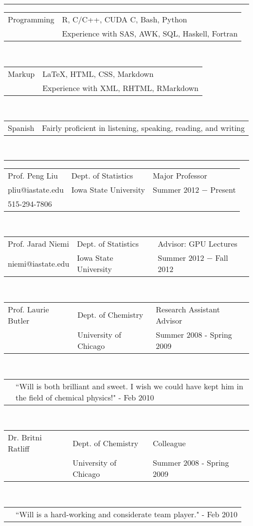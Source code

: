 \documentclass{article}
\newcommand{\q}{$\quad$ \newline}
\newcommand{\vl}{4.25}
\newcommand{\wl}{8.4}
\newcommand{\ww}{13}
\newcommand{\myrule}{\noindent \rule{\textwidth}{1pt}}
\begin{document}

\myrule
 
\noindent \begin{tabular}{@{}p{\vl cm}p{\ww cm}@{}}
Programming & R, C/C++, CUDA C, Bash, Python   \\
 & Experience with SAS, AWK, SQL, Haskell, Fortran  \\
\end{tabular} \q \q

\noindent \begin{tabular}{@{}p{\vl cm}p{\ww cm}@{}}
Markup& LaTeX, HTML, CSS, Markdown   \\
 & Experience with XML, RHTML, RMarkdown  \\
\end{tabular} \q \q

\noindent \begin{tabular}{@{}p{\vl cm}p{\ww cm}@{}}
Spanish & Fairly proficient in listening, speaking, reading, and writing   \\
\end{tabular} \q \q \q


\myrule

\noindent \begin{tabular}{@{}p{\vl cm}p{\wl cm}l@{}}
Prof. Peng Liu & Dept. of Statistics & Major Professor \\
pliu@iastate.edu & Iowa State University & Summer 2012 $-$ Present \\
515-294-7806 & & 
\end{tabular} \q \q

\noindent \begin{tabular}{@{}p{\vl cm}p{\wl cm}l@{}}
Prof. Jarad Niemi & Dept. of Statistics & Advisor: GPU Lectures  \\
niemi@iastate.edu & Iowa State University & Summer 2012 $-$ Fall 2012 \\
\end{tabular} \q \q

\noindent \begin{tabular}{@{}p{\vl cm}p{\wl cm}l@{}}
Prof. Laurie Butler & Dept. of Chemistry & Research Assistant Advisor \\
& University of Chicago & Summer 2008 - Spring 2009
\end{tabular} \q \q

\noindent \begin{tabular}{@{}p{\vl cm}p{\ww cm}@{}}
&``Will is both brilliant and sweet. I wish we could have kept him in the field of chemical physics!" - Feb 2010
\end{tabular} \q \q

\noindent \begin{tabular}{@{}p{\vl cm}p{\wl cm}l@{}}
Dr. Britni Ratliff & Dept. of Chemistry & Colleague \\
& University of Chicago & Summer 2008 - Spring 2009
\end{tabular} \q \q

\noindent \begin{tabular}{@{}p{\vl cm}p{\ww cm}@{}}
&``Will is a hard-working and considerate team player." - Feb 2010
\end{tabular}
\end{document}
